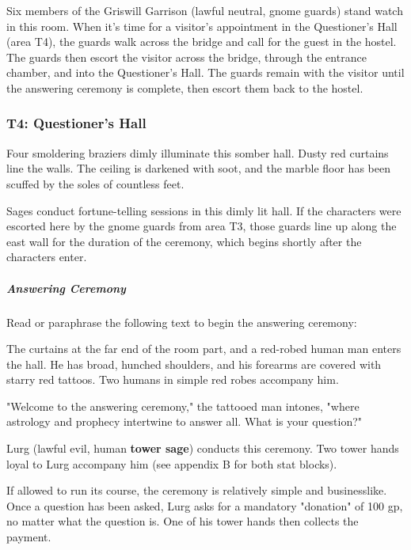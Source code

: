 \documentclass[10pt,a4paper,twoside,bg=print,twocolumn,openany,nodeprecatedcode]{dndbook}
\begin{document}
Six members of the Griswill Garrison (lawful neutral, gnome guards) stand watch in this room. When it's time for a visitor's appointment in the Questioner's Hall (area T4), the guards walk across the bridge and call for the guest in the hostel. The guards then escort the visitor across the bridge, through the entrance chamber, and into the Questioner's Hall. The guards remain with the visitor until the answering ceremony is complete, then escort them back to the hostel.

\subsubsection{T4: Questioner's Hall}
\begin{DndReadAloud}{}
Four smoldering braziers dimly illuminate this somber hall. Dusty red curtains line the walls. The ceiling is darkened with soot, and the marble floor has been scuffed by the soles of countless feet.

\end{DndReadAloud}

Sages conduct fortune-telling sessions in this dimly lit hall. If the characters were escorted here by the gnome guards from area T3, those guards line up along the east wall for the duration of the ceremony, which begins shortly after the characters enter.

\subparagraph{Answering Ceremony}
Read or paraphrase the following text to begin the answering ceremony:

\begin{DndReadAloud}{}
The curtains at the far end of the room part, and a red-robed human man enters the hall. He has broad, hunched shoulders, and his forearms are covered with starry red tattoos. Two humans in simple red robes accompany him.

"Welcome to the answering ceremony," the tattooed man intones, "where astrology and prophecy intertwine to answer all. What is your question?"

\end{DndReadAloud}

Lurg (lawful evil, human \textbf{tower sage}) conducts this ceremony. Two tower hands loyal to Lurg accompany him (see appendix B for both stat blocks).

If allowed to run its course, the ceremony is relatively simple and businesslike. Once a question has been asked, Lurg asks for a mandatory "donation" of 100 gp, no matter what the question is. One of his tower hands then collects the payment.
\end{document}

